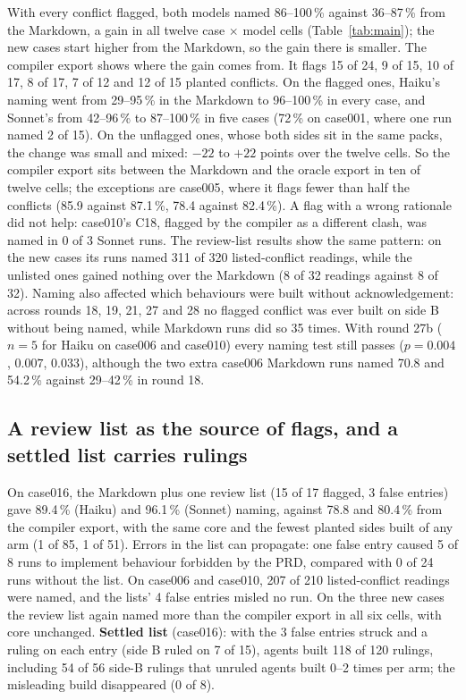 \documentclass{article}
\begin{document}
With every conflict flagged, both models named 86--100\,\% against 36--87\,\% from the Markdown, a gain in all
twelve case $\times$ model cells (Table~\ref{tab:main}); the new cases start higher from the Markdown, so the
gain there is smaller. The compiler export shows where the gain comes from. It flags 15 of 24, 9 of 15, 10
of 17, 8 of 17, 7 of 12 and 12 of 15 planted conflicts. On the flagged ones, Haiku's naming went from
29--95\,\% in the Markdown to 96--100\,\% in every case, and Sonnet's from 42--96\,\% to 87--100\,\% in five cases
(72\,\% on case001, where one run named 2 of 15). On the unflagged ones, whose both sides sit in the same
packs, the change was small and mixed: $-22$ to $+22$ points over the twelve cells. So the compiler export sits
between the Markdown and the oracle export in ten of twelve cells; the exceptions are case005, where it
flags fewer than half the conflicts (85.9 against 87.1\,\%, 78.4 against 82.4\,\%). A flag with a wrong
rationale did not help: case010's C18, flagged by the compiler as a different clash, was named in 0 of 3
Sonnet runs. The review-list results show the same pattern: on the new cases its runs named 311 of 320 listed-conflict
readings, while the unlisted ones gained nothing over the Markdown (8 of 32 readings against 8 of 32).
Naming also affected which behaviours were built without acknowledgement: across rounds 18, 19, 21, 27 and 28 no flagged conflict was
ever built on side B without being named, while Markdown runs did so 35 times. With round 27b ($n = 5$ for
Haiku on case006 and case010) every naming test still passes ($p = 0.004$, $0.007$, $0.033$), although the two
extra case006 Markdown runs named 70.8 and 54.2\,\% against 29--42\,\% in round 18.

\subsection{A review list as the source of flags, and a settled list carries rulings}\label{sec:list}

On case016, the Markdown plus one review list (15 of 17 flagged, 3 false entries) gave 89.4\,\% (Haiku) and
96.1\,\% (Sonnet) naming, against 78.8 and 80.4\,\% from the compiler export, with the same core and the fewest
planted sides built of any arm (1 of 85, 1 of 51). Errors in the list can propagate: one false entry caused 5 of 8 runs to implement behaviour forbidden by the PRD, compared with 0 of 24 runs without the list. On case006 and case010,
207 of 210 listed-conflict readings were named, and the lists' 4 false entries misled no run. On the
three new cases the review list again named more than the compiler export in all six cells, with core
unchanged. \textbf{Settled list} (case016): with the 3 false entries struck and a ruling on each entry (side B
ruled on 7 of 15), agents built 118 of 120 rulings, including 54 of 56 side-B rulings that unruled agents
built 0--2 times per arm; the misleading build disappeared (0 of 8).
\end{document}

